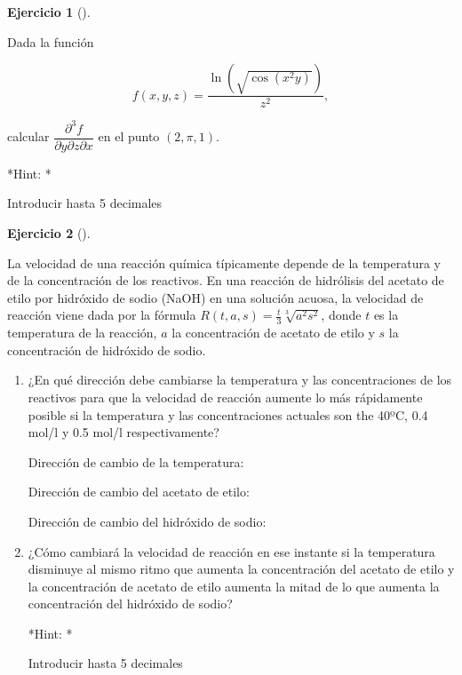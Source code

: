 \documentclass[
  a4paper,
]{scrreport}
\theoremstyle{definition}
\newtheorem{exercise}{Ejercicio}[chapter]
\theoremstyle{remark}
\begin{document}
\begin{exercise}[]\protect\hypertarget{exr-derivadas-funciones-varias-variables-propuesto-2}{}\label{exr-derivadas-funciones-varias-variables-propuesto-2}

Dada la función

\[
f(x,y,z)=\frac{\ln(\sqrt{\cos(x^2y)})}{z^2},
\]

calcular \(\dfrac{\partial^3 f}{\partial y\partial z\partial x}\) en el
punto \((2,\pi,1)\).

\vspace{18pt}*Hint: *

Introducir hasta 5 decimales

\end{exercise}

\begin{exercise}[]\protect\hypertarget{exr-derivadas-funciones-varias-variables-propuesto-3}{}\label{exr-derivadas-funciones-varias-variables-propuesto-3}

La velocidad de una reacción química típicamente depende de la
temperatura y de la concentración de los reactivos. En una reacción de
hidrólisis del acetato de etilo por hidróxido de sodio (NaOH) en una
solución acuosa, la velocidad de reacción viene dada por la fórmula
\(R(t,a,s)=\frac{t}{3}\sqrt[3]{a^2s^2}\), donde \(t\) es la temperatura
de la reacción, \(a\) la concentración de acetato de etilo y \(s\) la
concentración de hidróxido de sodio.

\begin{enumerate}
\def\labelenumi{\alph{enumi}.}
\item
  ¿En qué dirección debe cambiarse la temperatura y las concentraciones
  de los reactivos para que la velocidad de reacción aumente lo más
  rápidamente posible si la temperatura y las concentraciones actuales
  son the 40ºC, 0.4 mol/l y 0.5 mol/l respectivamente?

  Dirección de cambio de la temperatura: 

  \vspace{18pt}

  Dirección de cambio del acetato de etilo: 

  \vspace{18pt}

  Dirección de cambio del hidróxido de sodio: 

  \vspace{18pt}
\item
  ¿Cómo cambiará la velocidad de reacción en ese instante si la
  temperatura disminuye al mismo ritmo que aumenta la concentración del
  acetato de etilo y la concentración de acetato de etilo aumenta la
  mitad de lo que aumenta la concentración del hidróxido de sodio?

  \vspace{18pt}*Hint: *

  Introducir hasta 5 decimales
\end{enumerate}

\end{exercise}
\end{document}

